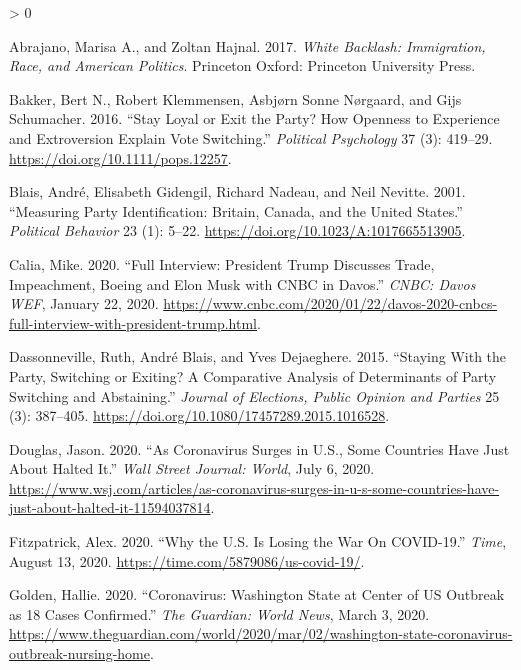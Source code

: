 \documentclass[
  12pt,
]{article}
\newlength{\cslhangindent}
\newenvironment{CSLReferences}[2] %
 {%
  \setlength{\parindent}{0pt}
  \ifodd #1 \everypar{\setlength{\hangindent}{\cslhangindent}}\ignorespaces\fi
  \ifnum #2 > 0
  \setlength{\parskip}{#2\baselineskip}
  \fi
 }%
 {}
\begin{document}
\hypertarget{refs}{}
\begin{CSLReferences}{1}{0}
\leavevmode\hypertarget{ref-Abrajano2017}{}%
Abrajano, Marisa A., and Zoltan Hajnal. 2017. \emph{White Backlash: Immigration, Race, and {American} Politics}. {Princeton Oxford}: {Princeton University Press}.

\leavevmode\hypertarget{ref-Bakker2016}{}%
Bakker, Bert N., Robert Klemmensen, Asbjørn Sonne Nørgaard, and Gijs Schumacher. 2016. {``Stay {Loyal} or {Exit} the {Party}? {How Openness} to {Experience} and {Extroversion Explain Vote Switching}.''} \emph{Political Psychology} 37 (3): 419--29. \url{https://doi.org/10.1111/pops.12257}.

\leavevmode\hypertarget{ref-Blais2001}{}%
Blais, André, Elisabeth Gidengil, Richard Nadeau, and Neil Nevitte. 2001. {``Measuring {Party Identification}: {Britain}, {Canada}, and the {United States}.''} \emph{Political Behavior} 23 (1): 5--22. \url{https://doi.org/10.1023/A:1017665513905}.

\leavevmode\hypertarget{ref-Calia2020}{}%
Calia, Mike. 2020. {``Full Interview: {President Trump} Discusses Trade, Impeachment, {Boeing} and {Elon Musk} with {CNBC} in {Davos}.''} \emph{CNBC: Davos WEF}, January 22, 2020. \url{https://www.cnbc.com/2020/01/22/davos-2020-cnbcs-full-interview-with-president-trump.html}.

\leavevmode\hypertarget{ref-Dassonneville2015}{}%
Dassonneville, Ruth, André Blais, and Yves Dejaeghere. 2015. {``Staying {With} the {Party}, {Switching} or {Exiting}? {A Comparative Analysis} of {Determinants} of {Party Switching} and {Abstaining}.''} \emph{Journal of Elections, Public Opinion and Parties} 25 (3): 387--405. \url{https://doi.org/10.1080/17457289.2015.1016528}.

\leavevmode\hypertarget{ref-Douglas2020}{}%
Douglas, Jason. 2020. {``As {Coronavirus Surges} in {U}.{S}., {Some Countries Have Just About Halted It}.''} \emph{Wall Street Journal: World}, July 6, 2020. \url{https://www.wsj.com/articles/as-coronavirus-surges-in-u-s-some-countries-have-just-about-halted-it-11594037814}.

\leavevmode\hypertarget{ref-Fitzpatrick2020}{}%
Fitzpatrick, Alex. 2020. {``Why the {U}.{S}. {Is Losing} the {War On COVID}-19.''} \emph{Time}, August 13, 2020. \url{https://time.com/5879086/us-covid-19/}.

\leavevmode\hypertarget{ref-Golden2020}{}%
Golden, Hallie. 2020. {``Coronavirus: {Washington} State at Center of {US} Outbreak as 18 Cases Confirmed.''} \emph{The Guardian: World News}, March 3, 2020. \url{https://www.theguardian.com/world/2020/mar/02/washington-state-coronavirus-outbreak-nursing-home}.


\end{CSLReferences}
\end{document}
